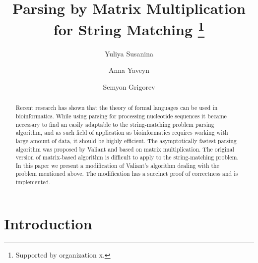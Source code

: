 \documentclass[runningheads]{llncs}
\begin{document}
%
\title{Parsing by Matrix Multiplication for String Matching \thanks{Supported by organization x.}}
%
%
\author{Yuliya Susanina \and
Anna Yaveyn \and
Semyon Grigorev}
%
%
%
\maketitle              %
%
\begin{abstract}
Recent  research  has  shown  that the theory of formal languages can be used in bioinformatics. While using parsing for processing nucleotide sequences it became necessary to find an easily adaptable to the string-matching problem parsing algorithm, and as such field of application as bioinformatics requires working with large amount of data, it should be highly efficient. The asymptotically fastest parsing algorithm was proposed by Valiant and based on matrix multiplication. The original version of matrix-based algorithm is difficult to apply to the string-matching problem. In this paper we present  a modification  of Valiant's  algorithm dealing with the problem mentioned above. The modification has a succinct proof of correctness and is implemented. 

\end{abstract}
%
%
%
\section{Introduction}
\end{document}
